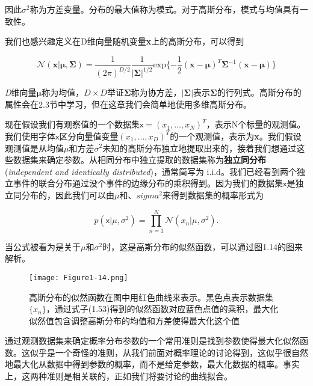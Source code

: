 	因此$\sigma^2$称为方差变量。分布的最大值称为模式。对于高斯分布，模式与均值具有一致性。
	
	我们也感兴趣定义在D维向量随机变量\textbf{x}上的高斯分布，可以得到
	
	\begin{equation}
	\mathcal{N}( \mathbf{x}  |  \mathbf{\mu} , \mathbf{ \Sigma }) = \frac{1}{(2\pi)^{D/2}} \frac{1}{ |\mathbf{\Sigma}|^{1/2} }\mathrm{exp} \{ -\frac{1}{2}(\mathbf{ x } - \mathbf{ \mu })^T \mathbf{\Sigma}^{-1}(\mathbf{x} - \mathbf{\mu}) \}
	\end{equation}
	
	\textit{D}维向量$\mathbf{\mu}$称为均值，$D \times D$举证$\mathbf{\Sigma}$称为协方差，$|\mathbf{\Sigma}|$表示$\mathbf{\Sigma}$的行列式。高斯分布的属性会在2.3节中学习，但在这章我们会简单地使用多维高斯分布。
	
	现在假设我们有观察值的一个数据集$\mathsf{x} = (x_1, \dots, x_N)^T$，表示N个标量的观测值。我们使用字体$\mathsf{x}$区分向量值变量$(x_1, \dots, x_D)^T$的一个观测值，表示为\textbf{x}。我们假设观测值是从均值$\mu$和方差$\sigma^2$未知的高斯分布独立地提取出来的，接着我们想通过这些数据集来确定参数。从相同分布中独立提取的数据集称为\textbf{独立同分布}(\textit{independent and identically distributed})，通常简写为 i.i.d。我们已经看到两个独立事件的联合分布通过没个事件的边缘分布的乘积得到。因为我们的数据集$\mathsf{x}$是独立同分布的，因此我们可以由$\mu$和$、sigma^2$来得到数据集的概率形式为
	
	\begin{equation}
	p(\mathsf{x} | \mu, \sigma^2) = \prod_{n = 1}^{N} \mathcal{N}(x_n|\mu, \sigma^2).
	\end{equation}
	
	当公式被看为是关于$\mu$和$\sigma^2$时，这是高斯分布的似然函数，可以通过图1.14的图来解析。
	
	\begin{figure}[t]
		\parbox{.4\textwidth}{\caption{ 高斯分布的似然函数在图中用红色曲线来表示。黑色点表示数据集$\{ x_n \}$，通过式子(1.53)得到的似然函数对应蓝色点值的乘积，最大化似然值包含调整高斯分布的均值和方差使得最大化这个值 }}
		\parbox{.5\textwidth}{\texttt{[image: Figure1-14.png]}}
	\end{figure}
	
	通过观测数据集来确定概率分布参数的一个常用准则是找到参数使得最大化似然函数。这似乎是一个奇怪的准则，从我们前面对概率理论的讨论得到，这似乎很自然地最大化从数据中得到参数的概率，而不是给定参数，最大化数据的概率。事实上，这两种准则是相关联的，正如我们将要讨论的曲线拟合。
	

